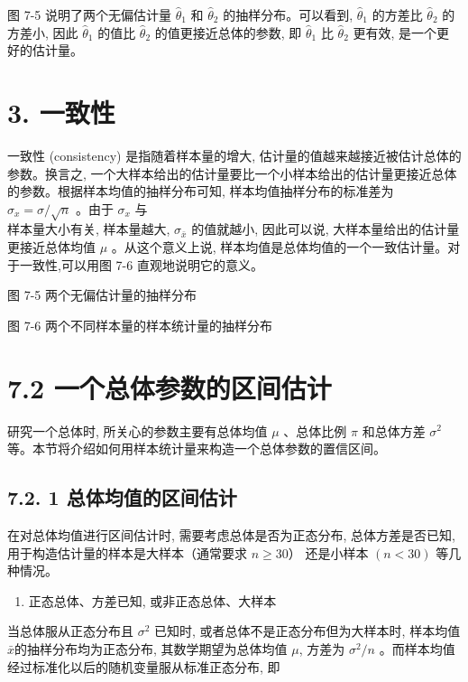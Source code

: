 \documentclass[10pt]{article}
\begin{document}
\begin{CJK*}{UTF8}{bsmi}
图 7-5 说明了两个无偏估计量 $\hat{\theta}_{1}$ 和 $\hat{\theta}_{2}$ 的抽样分布。可以看到, $\hat{\theta}_{1}$ 的方差比 $\hat{\theta}_{2}$ 的方差小, 因此 $\hat{\theta}_{1}$ 的值比 $\hat{\theta}_{2}$ 的值更接近总体的参数, 即 $\hat{\theta}_{1}$ 比 $\hat{\theta}_{2}$ 更有效, 是一个更好的估计量。

\section*{3. 一致性}
一致性 (consistency) 是指随着样本量的增大, 估计量的值越来越接近被估计总体的参数。换言之, 一个大样本给出的估计量要比一个小样本给出的估计量更接近总体的参数。根据样本均值的抽样分布可知, 样本均值抽样分布的标准差为 $\sigma_{x}=\sigma / \sqrt{n}$ 。由于 $\sigma_{x}$ 与\\
样本量大小有关, 样本量越大, $\sigma_{\bar{x}}$ 的值就越小, 因此可以说, 大样本量给出的估计量更接近总体均值 $\mu$ 。从这个意义上说, 样本均值是总体均值的一个一致估计量。对于一致性,可以用图 7-6 直观地说明它的意义。

\begin{center}
\end{center}

图 7-5 两个无偏估计量的抽样分布

\begin{center}
\end{center}

图 7-6 两个不同样本量的样本统计量的抽样分布

\section*{7.2 一个总体参数的区间估计}
研究一个总体时, 所关心的参数主要有总体均值 $\mu$ 、总体比例 $\pi$ 和总体方差 $\sigma^{2}$ 等。本节将介绍如何用样本统计量来构造一个总体参数的置信区间。

\subsection*{7.2. 1 总体均值的区间估计}
在对总体均值进行区间估计时, 需要考虑总体是否为正态分布, 总体方差是否已知,用于构造估计量的样本是大样本（通常要求 $n \geqslant 30 ）$ 还是小样本 $(n<30)$ 等几种情况。

\begin{enumerate}
  \item 正态总体、方差已知, 或非正态总体、大样本
\end{enumerate}

当总体服从正态分布且 $\sigma^{2}$ 已知时, 或者总体不是正态分布但为大样本时, 样本均值 $\bar{x}$的抽样分布均为正态分布, 其数学期望为总体均值 $\mu$, 方差为 $\sigma^{2} / n$ 。而样本均值经过标准化以后的随机变量服从标准正态分布, 即



\end{CJK*}
\end{document}
